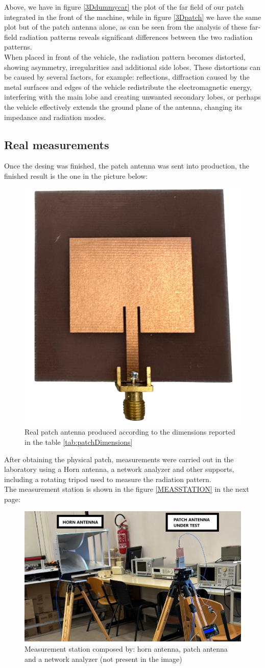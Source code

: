 \documentclass[]{article}
\begin{document}
Above, we have in figure \eqref{3Ddummycar} the plot of the far field of our patch integrated in the front of the machine, while in figure \eqref{3Dpatch} we have the same plot but of the patch antenna alone, as can be seen from the analysis of these far-field radiation patterns reveals significant differences between the two radiation patterns.\\
When placed in front of the vehicle, the radiation pattern becomes distorted, showing asymmetry, irregularities and additional side lobes. These distortions can be caused by several factors, for example: reflections, diffraction caused by the metal surfaces and edges of the vehicle redistribute the electromagnetic energy, interfering with the main lobe and creating unwanted secondary lobes, or perhaps the vehicle effectively extends the ground plane of the antenna, changing its impedance and radiation modes. 



\subsection{Real measurements}
Once the desing was finished, the patch antenna was sent into production, the finished result is the one in the picture below:
\begin{figure}[h]
	\centering
	\includegraphics[width=0.35\linewidth]{img/img12}
	\caption{Real patch antenna produced according to the dimensions reported in the table \eqref{tab:patchDimensions}}
	\label{realpatch}
\end{figure}


After obtaining the physical patch, measurements were carried out in the laboratory using a Horn antenna, a network analyzer and other supports, including a rotating tripod used to measure the radiation pattern.\\
The measurement station is shown in the figure \eqref{MEASSTATION} in the next page:
\begin{figure}[H]
	\centering
	\includegraphics[width=0.5\linewidth]{img/img13}
	\caption{Measurement station composed by: horn antenna, patch antenna and a network analyzer (not present in the image)}
	\label{MEASSTATION}
\end{figure}
\end{document}
